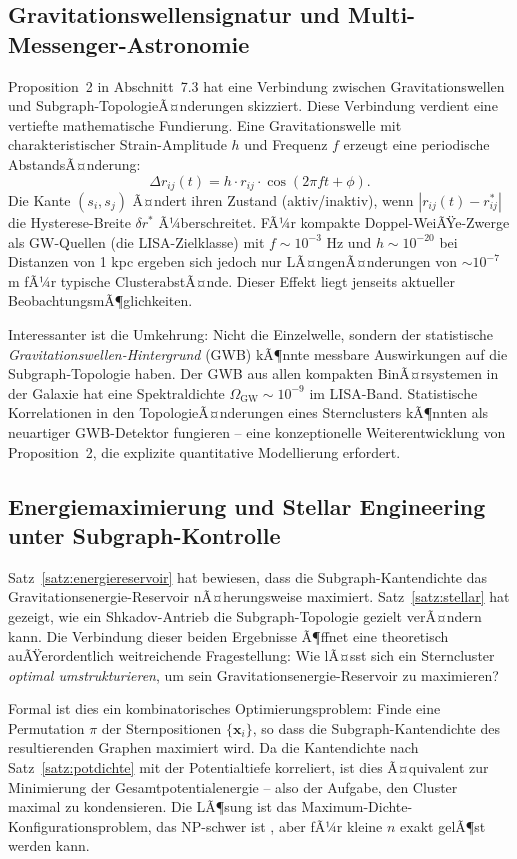 ﻿\documentclass[a4paper,12pt]{report}
\theoremstyle{definition}
\begin{document}
\subsection{Gravitationswellensignatur und Multi-Messenger-Astro\-nomie}

Proposition~2 in Abschnitt~7.3 hat eine Verbindung zwischen Gravitationswellen und Subgraph-TopologieÃ¤nderungen skizziert. Diese Verbindung verdient eine vertiefte mathematische Fundierung. Eine Gravitationswelle mit charakteristischer Strain-Amplitude $h$ und Frequenz $f$ erzeugt eine periodische AbstandsÃ¤nderung:
\[
\Delta r_{ij}(t) = h \cdot r_{ij} \cdot \cos(2\pi f t + \phi).
\]
Die Kante $(s_i, s_j)$ Ã¤ndert ihren Zustand (aktiv/inaktiv), wenn $|r_{ij}(t) - r_{ij}^*|$ die Hysterese-Breite $\delta r^*$ Ã¼berschreitet. FÃ¼r kompakte Doppel-WeiÃŸe-Zwerge als GW-Quellen (die LISA-Zielklasse) mit $f \sim 10^{-3}$ Hz und $h \sim 10^{-20}$ bei Distanzen von 1 kpc ergeben sich jedoch nur LÃ¤ngenÃ¤nderungen von $\sim 10^{-7}$ m fÃ¼r typische ClusterabstÃ¤nde. Dieser Effekt liegt jenseits aktueller BeobachtungsmÃ¶glichkeiten.

Interessanter ist die Umkehrung: Nicht die Einzelwelle, sondern der statistische \emph{Gravita\-tionswellen-Hintergrund} (GWB) kÃ¶nnte messbare Auswirkungen auf die Subgraph-Topologie haben. Der GWB aus allen kompakten BinÃ¤rsystemen in der Galaxie hat eine Spektraldichte $\Omega_\mathrm{GW} \sim 10^{-9}$ im LISA-Band. Statistische Korrelationen in den TopologieÃ¤nderungen eines Sternclusters kÃ¶nnten als neuartiger GWB-Detektor fungieren -- eine konzeptionelle Weiterentwicklung von Proposition~2, die explizite quantitative Modellierung erfordert.

\subsection{Energiemaximierung und Stellar Engineering unter Sub\-graph-Kontrolle}

Satz~\ref{satz:energiereservoir} hat bewiesen, dass die Subgraph-Kantendichte das Gravitationsenergie-Reservoir nÃ¤herungsweise maximiert. Satz~\ref{satz:stellar} hat gezeigt, wie ein Shkadov-Antrieb die Subgraph-Topologie gezielt verÃ¤ndern kann. Die Verbindung dieser beiden Ergebnisse Ã¶ffnet eine theoretisch auÃŸerordentlich weitreichende Fragestellung: Wie lÃ¤sst sich ein Sterncluster \emph{optimal umstrukturieren}, um sein Gravitationsenergie-Reservoir zu maximieren?

Formal ist dies ein kombinatorisches Optimierungsproblem: Finde eine Permutation $\pi$ der Sternpositionen $\{\mathbf{x}_i\}$, so dass die Subgraph-Kantendichte des resultierenden Graphen maximiert wird. Da die Kantendichte nach Satz~\ref{satz:potdichte} mit der Potentialtiefe korreliert, ist dies Ã¤quivalent zur Minimierung der Gesamtpotentialenergie -- also der Aufgabe, den Cluster maximal zu kondensieren. Die LÃ¶sung ist das Maximum-Dichte-Konfigurationsproblem, das NP-schwer ist \cite{heggie2003}, aber fÃ¼r kleine $n$ exakt gelÃ¶st werden kann.
\end{document}
